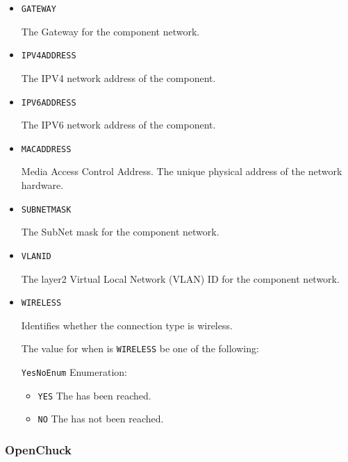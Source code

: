 \begin{itemize}

\item \texttt{GATEWAY}


The Gateway for the component network.

\item \texttt{IPV4\textunderscore ADDRESS}


The IPV4 network address of the component.


\item \texttt{IPV6\textunderscore ADDRESS}


The IPV6 network address of the component.


\item \texttt{MAC\textunderscore ADDRESS}


Media Access Control Address. The unique physical address of the network hardware.


\item \texttt{SUBNET\textunderscore MASK}


The SubNet mask for the component network.


\item \texttt{VLAN\textunderscore ID}


The layer2 Virtual Local Network (VLAN) ID for the component network.

\item \texttt{WIRELESS}


Identifies whether the connection type is wireless.


The value for  when  is \texttt{WIRELESS} \MUST be one of the following: 


\texttt{YesNoEnum} Enumeration:

\begin{itemize}
\item \texttt{YES} \newline The  has been reached. 
\item \texttt{NO} \newline The  has not been reached. 
\end{itemize}


\end{itemize}










\subsubsection{OpenChuck}
\label{sec:OpenChuck}



